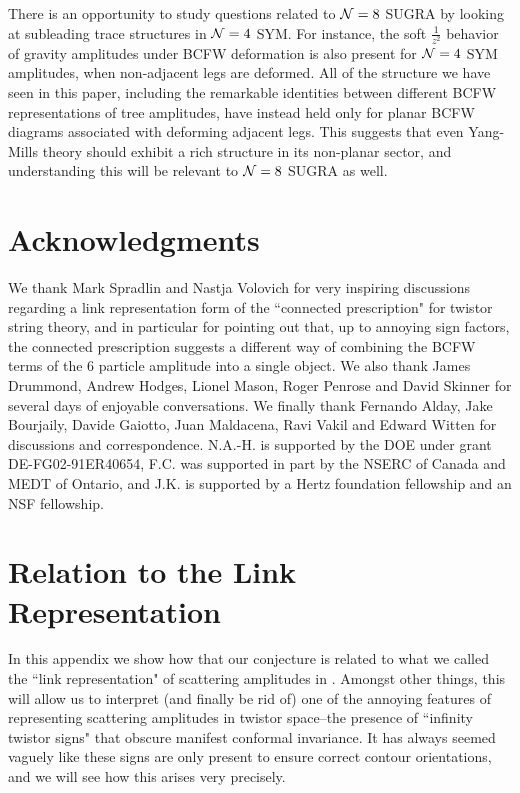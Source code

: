 \documentclass[12pt]{article}
\begin{document}
There is an opportunity to study questions related to ${\cal N}=8$ SUGRA by looking at subleading trace structures in ${\cal N}=4$ SYM. For instance, the soft $\frac{1}{z^2}$ behavior of gravity amplitudes under BCFW deformation is also present for ${\cal N}=4$ SYM amplitudes, when non-adjacent legs are deformed. All of the structure we have seen in this paper, including the remarkable identities between different BCFW representations of tree amplitudes, have instead held only for planar BCFW diagrams associated with deforming adjacent legs. This suggests that even Yang-Mills theory should exhibit a rich structure in its non-planar sector, and understanding this will be relevant to ${\cal N}=8$ SUGRA as well.


\section*{Acknowledgments}

We thank Mark Spradlin and Nastja Volovich for very inspiring
discussions regarding a link representation form of the ``connected
prescription" for twistor string theory, and in particular for
pointing out that, up to annoying sign factors, the connected
prescription suggests a different way of combining the BCFW terms of
the 6 particle amplitude into a single object. We also thank James
Drummond, Andrew Hodges, Lionel Mason, Roger Penrose and David
Skinner for several days of enjoyable conversations. We finally
thank Fernando Alday, Jake Bourjaily, Davide Gaiotto, Juan
Maldacena, Ravi Vakil and Edward Witten for discussions and
correspondence. N.A.-H. is supported by the DOE under grant
DE-FG02-91ER40654, F.C. was supported in part by the NSERC of Canada
and MEDT of Ontario, and J.K. is supported by a Hertz foundation
fellowship and an NSF fellowship.



\appendix

\section{Relation to the Link Representation}

In this appendix we show how that our conjecture is related to what we called the ``link representation" of scattering amplitudes in \cite{ArkaniHamed:2009si}. Amongst other things, this will allow us to interpret (and finally be rid of) one of the annoying features of representing scattering amplitudes in twistor space--the presence of ``infinity twistor signs" \cite{ArkaniHamed:2009si, lioneldavid, Bargheer:2009qu} that obscure  manifest conformal invariance. It has always seemed vaguely like these signs are only present to ensure correct contour orientations, and we will see how this arises very precisely.
\end{document}
